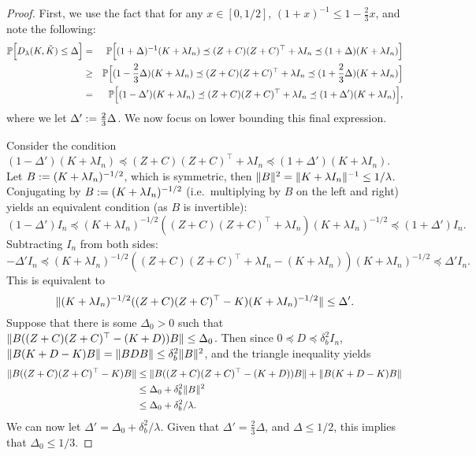 \begin{proof}
First, we use the fact that for any $x\in[0,1/2]$, $(1+x)^{-1} \leq 1-\frac{2}{3}x$, and note the following:
\begin{eqnarray*}
\mathbb{P}\Big[D_{\lambda}(K,\tilde{K}) \leq \Delta\Big] &=& \mathbb{P}\Big[(1 + \Delta)^{-1}(K + \lambda I_n) \preceq (Z + C) (Z + C)^\top + \lambda I_n \preceq (1 + \Delta)(K + \lambda I_n)\Big] \\
&\geq& \mathbb{P}\Big[(1 - \frac{2}{3}\Delta)(K + \lambda I_n) \preceq (Z + C) (Z + C)^\top + \lambda I_n \preceq (1 + \frac{2}{3}\Delta)(K + \lambda I_n)\Big]\\
&=& \mathbb{P}\Big[(1 - \Delta')(K + \lambda I_n) \preceq (Z + C) (Z + C)^\top + \lambda I_n \preceq (1 + \Delta')(K + \lambda I_n)\Big],
\end{eqnarray*}
where we let $\Delta' := \frac{2}{3}\Delta$.  We now focus on lower bounding this final expression.

Consider the condition $(1 - \Delta')(K + \lambda I_n) \preceq (Z + C) (Z + C)^\top + \lambda I_n \preceq (1 +
\Delta')(K + \lambda I_n)$.
Let $B := (K + \lambda I_n)^{-1/2}$, which is symmetric, then $\|B\|^2 =
\|K + \lambda I_n\|^{-1} \leq 1/\lambda$.
Conjugating by $B := (K + \lambda I_n)^{-1/2}$ (i.e.\ multiplying by $B$ on the
left and right) yields an equivalent condition (as $B$ is
invertible):
\begin{equation*}
(1 - \Delta') I_n \preceq (K + \lambda I_n)^{-1/2} ((Z + C) (Z + C)^\top + \lambda I_n) (K + \lambda I_n)^{-1/2} \preceq (1 + \Delta') I_n.
\end{equation*}
Subtracting $I_n$ from both sides:
\begin{equation*}
-\Delta' I_n \preceq (K + \lambda I_n)^{-1/2} ((Z + C) (Z + C)^\top + \lambda I_n - (K + \lambda I_n)) (K + \lambda I_n)^{-1/2} \preceq \Delta' I_n.
\end{equation*}
This is equivalent to
\begin{equation*}
\|(K + \lambda I_n)^{-1/2} ((Z + C) (Z + C)^\top - K) (K + \lambda I_n)^{-1/2}\| \leq \Delta'.
\end{equation*}
Suppose that there is some $\Delta_0 > 0$ such that $\|B((Z + C)(Z + C)^\top - (K + D))B\| \leq \Delta_0$.
Then since $0 \preceq D \preceq \delta^2_b I_n$, $\|B(K + D - K) B\| = \|B D B\| \leq \delta^2_b
\|B\|^2$, and the triangle inequality yields
\begin{align*}
\|B((Z + C)(Z + C)^\top - K)B\|
&\leq \|B((Z + C)(Z + C)^\top - (K + D))B\| + \|B (K + D - K)B\| \\
&\leq \Delta_0 + \delta^2_b \|B\|^2 \\
&\leq \Delta_0 + \delta^2_b/\lambda.
\end{align*}
We can now let $\Delta' = \Delta_0 + \delta^2_b/\lambda$.  Given that $\Delta' = \frac{2}{3}\Delta$, and
$\Delta \leq 1/2$, this implies that $\Delta_0 \leq 1/3$.


\end{proof}
